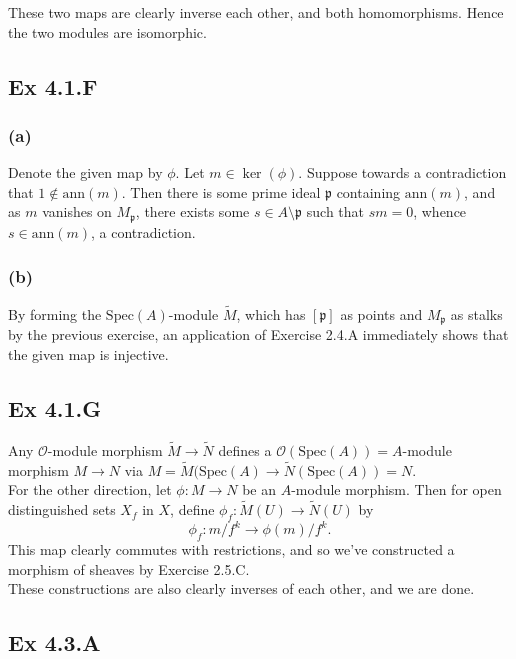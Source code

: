\documentclass{article}
\theoremstyle{definition}
\newcommand{\Spec}{\text{Spec}}
\newcommand{\ann}{\text{ann}}
\begin{document}
These two maps are clearly inverse each other, and both homomorphisms. Hence
the two modules are isomorphic.

\subsection*{Ex 4.1.F}

\subsubsection*{(a)}

Denote the given map by $\phi$. Let $m \in \ker(\phi)$. Suppose towards a
contradiction that $1 \not \in \ann(m)$. Then there is some prime ideal
$\mathfrak{p}$ containing $\ann(m)$, and as $m$ vanishes on $M_{\mathfrak{p}}$,
there exists some $s \in A \setminus \mathfrak{p}$ such that $sm = 0$, whence
$s \in \ann(m)$, a contradiction.

\subsubsection*{(b)}

By forming the $\Spec(A)$-module $\widetilde{M}$, which has $[\mathfrak{p}]$ as
points and $M_{\mathfrak{p}}$ as stalks by the previous exercise, an
application of Exercise 2.4.A immediately shows that the given map is
injective.


\subsection*{Ex 4.1.G}

Any $\mathcal{O}$-module morphism $\widetilde{M} \to \widetilde{N}$ defines a
$\mathcal{O}(\Spec(A)) = A$-module morphism $M \to N$ via $M =
	\widetilde{M}(\Spec(A) \to \widetilde{N}(\Spec(A)) = N$. \\

For the other direction, let $\phi : M \to N$ be an $A$-module morphism. Then
for open distinguished sets $X_f$ in $X$, define $\phi_f : \widetilde{M}(U) \to
	\widetilde{N}(U)$ by
\[
	\phi_f
	:
	m/f^k
	\to
	\phi(m)/f^k.
\]
This map clearly commutes with restrictions, and so we've constructed a
morphism of sheaves by Exercise 2.5.C. \\

These constructions are also clearly inverses of each other, and we are done.

\subsection*{Ex 4.3.A}
\end{document}
